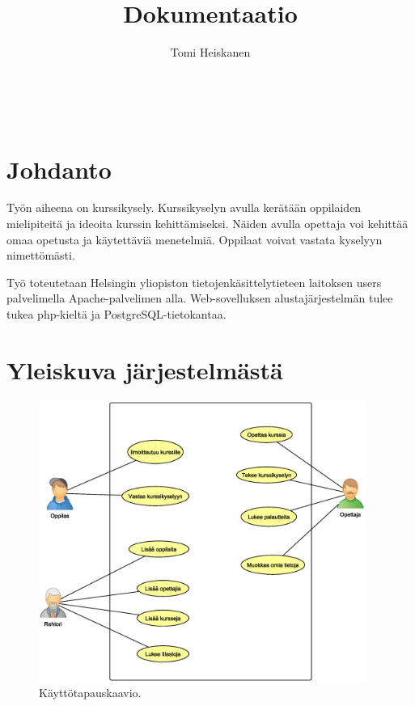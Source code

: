 \documentclass[12pt,twoside,a4paper,leqno,titlepage]{article}
\title{Dokumentaatio}
\author{Tomi Heiskanen}
\begin{document}
\maketitle

\
\thispagestyle{empty}
\newpage

\setcounter{page}{1}
\tableofcontents
\thispagestyle{empty}

\newpage
\section{Johdanto}

Työn aiheena on kurssikysely. Kurssikyselyn avulla kerätään oppilaiden
mielipiteitä ja ideoita kurssin kehittämiseksi. Näiden avulla opettaja voi
kehittää omaa opetusta ja käytettäviä menetelmiä. Oppilaat voivat vastata
kyselyyn nimettömästi.

Työ toteutetaan Helsingin yliopiston tietojenkäsittelytieteen laitoksen users
palvelimella Apache-palvelimen alla. Web-sovelluksen alustajärjestelmän tulee
tukea php-kieltä ja PostgreSQL-tietokantaa.

\section{Yleiskuva järjestelmästä}

\begin{figure}[!h]
  \centering
  \includegraphics[width=0.95\textwidth]{kayttotapauskaavio.eps}
  \caption{Käyttötapauskaavio.}
\end{figure}
\end{document}
